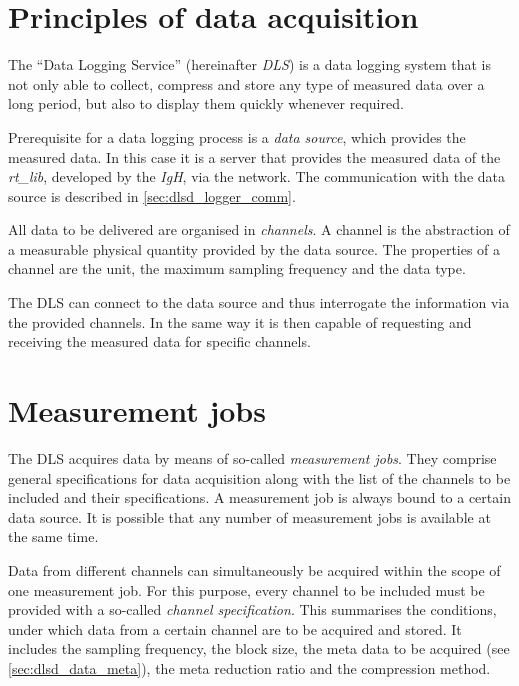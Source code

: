\documentclass[a4paper,12pt,BCOR6mm,bibtotoc,idxtotoc]{scrbook}
\begin{document}

\section{Principles of data acquisition}
\label{sec:allg_grund}

The ``Data Logging Service'' (hereinafter \textit{DLS}) is
a data logging system that is not only able to collect, compress and store any
type of measured data over a long period, but also to display them quickly
whenever required.

Prerequisite for a data logging process is a \textit{data source}, which provides the measured data. In this case it is a
server that provides the measured data of the \textit{rt\_lib}, developed by
the \textit{IgH}, via the network. The communication with the data source is
described in \autoref{sec:dlsd_logger_comm}.

All data to be delivered are organised in
\textit{channels}. A channel is the abstraction of a
measurable physical quantity provided by the data source. The properties of a
channel are the unit, the maximum sampling
frequency and the data
type.

The DLS can connect to the data source and thus interrogate the information
via the provided channels. In the same way it is then capable of requesting
and receiving the measured data for specific channels.


\section{Measurement jobs}
\label{sec:allg_jobs}

The DLS acquires data by means of so-called \textit{measurement
jobs}. They comprise general specifications
for data acquisition along with the list of the channels to be included and
their specifications. A measurement job is always bound to a certain data
source. It is possible that any number of measurement jobs is available at the
same time.

Data from different channels can simultaneously be acquired within the scope
of one measurement job. For this purpose, every channel to be included must be
provided with a so-called \textit{channel specification}. This summarises the conditions, under which data from a
certain channel are to be acquired and stored. It includes the sampling
frequency, the block size, the meta data to be acquired (see
\autoref{sec:dlsd_data_meta}), the meta reduction ratio and the compression
method.
\end{document}
